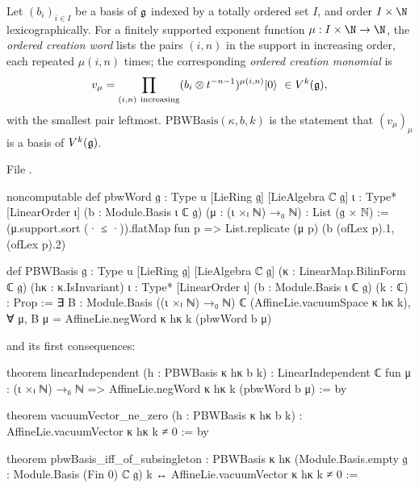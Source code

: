 \begin{definition}\label{l02:def:pbwbasis}
Let $(b_i)_{i\in I}$ be a basis of $\mathfrak{g}$ indexed by a totally ordered set $I$, and order $I\times\N$
lexicographically. For a finitely supported exponent function $\mu : I\times\N\to\N$, the
\emph{ordered creation word} lists the pairs $(i,n)$ in the support in increasing order, each repeated
$\mu(i,n)$ times; the corresponding \emph{ordered creation monomial} is
\begin{equation*}
 v_\mu = \prod_{(i,n)\ \text{increasing}}(b_i\otimes t^{-n-1})^{\mu(i,n)}\ltwovac\ \in V^k(\ltwog),
\end{equation*}
with the smallest pair leftmost. \emph{$\mathrm{PBWBasis}(\kappa,b,k)$} is the statement that
$(v_\mu)_\mu$ is a basis of $V^k(\mathfrak{g})$.
\end{definition}

File .
\begin{leancode}
noncomputable def pbwWord {𝔤 : Type u} [LieRing 𝔤] [LieAlgebra ℂ 𝔤] {ι : Type*} [LinearOrder ι]
    (b : Module.Basis ι ℂ 𝔤) (μ : (ι ×ₗ ℕ) →₀ ℕ) : List (𝔤 × ℕ) :=
  (μ.support.sort (· ≤ ·)).flatMap fun p => List.replicate (μ p) (b (ofLex p).1, (ofLex p).2)

def PBWBasis {𝔤 : Type u} [LieRing 𝔤] [LieAlgebra ℂ 𝔤]
    (κ : LinearMap.BilinForm ℂ 𝔤) (hκ : κ.IsInvariant)
    {ι : Type*} [LinearOrder ι] (b : Module.Basis ι ℂ 𝔤) (k : ℂ) : Prop :=
  ∃ B : Module.Basis ((ι ×ₗ ℕ) →₀ ℕ) ℂ (AffineLie.vacuumSpace κ hκ k),
    ∀ μ, B μ = AffineLie.negWord κ hκ k (pbwWord b μ)
\end{leancode}
and its first consequences:
\begin{leancode}
theorem linearIndependent (h : PBWBasis κ hκ b k) :
    LinearIndependent ℂ fun μ : (ι ×ₗ ℕ) →₀ ℕ => AffineLie.negWord κ hκ k (pbwWord b μ) := by

theorem vacuumVector_ne_zero (h : PBWBasis κ hκ b k) :
    AffineLie.vacuumVector κ hκ k ≠ 0 := by

theorem pbwBasis_iff_of_subsingleton :
    PBWBasis κ hκ (Module.Basis.empty 𝔤 : Module.Basis (Fin 0) ℂ 𝔤) k
      ↔ AffineLie.vacuumVector κ hκ k ≠ 0 :=
\end{leancode}

